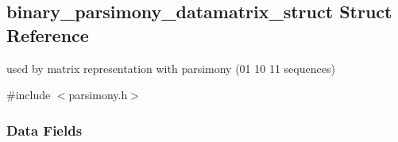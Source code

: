 \hypertarget{structbinary__parsimony__datamatrix__struct}{}\subsection{binary\+\_\+parsimony\+\_\+datamatrix\+\_\+struct Struct Reference}
\label{structbinary__parsimony__datamatrix__struct}


used by matrix representation with parsimony (01 10 11 sequences)  




{\ttfamily \#include $<$parsimony.\+h$>$}

\subsubsection*{Data Fields}
